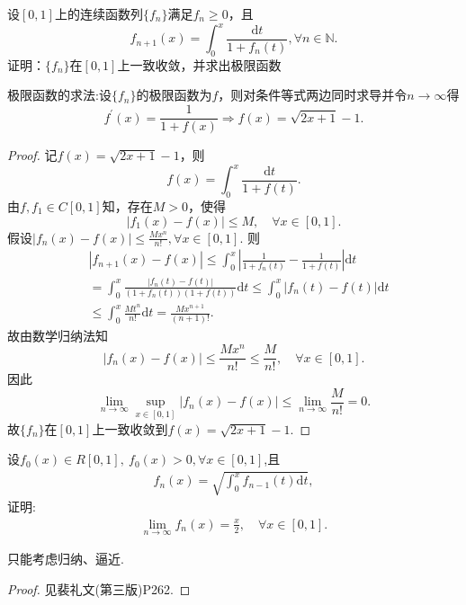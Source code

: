\documentclass[../../main.tex]{subfiles}%
\begin{document}
\begin{example}
设\( [0,1] \)上的连续函数列\( \{f_n\} \)满足\( f_n \geqslant 0 \)，且
\[
f_{n+1}(x) = \int_0^x \frac{\mathrm{d}t}{1 + f_n(t)}, \forall n \in \mathbb{N}.
\]
证明：\( \{f_n\} \)在\( [0,1] \)上一致收敛，并求出极限函数
\end{example}
\begin{note}
极限函数的求法:设\( \{f_n\} \)的极限函数为\( f \)，则对条件等式两边同时求导并令\( n\rightarrow \infty \)得
\[
f^\prime(x) = \frac{1}{1 + f(x)} \Longrightarrow f(x) = \sqrt{2x + 1} - 1.
\]
\end{note}
\begin{proof}
记\( f(x) = \sqrt{2x + 1} - 1 \)，则
\[
f(x) = \int_0^x{\frac{\mathrm{d}t}{1 + f(t)}}.
\]
由\( f,f_1 \in C[0,1] \)知，存在\( M > 0 \)，使得
\[
|f_1(x) - f(x)| \leqslant M,\quad \forall x \in [0,1].
\]
假设\( |f_n(x) - f(x)| \leqslant \frac{Mx^{n}}{n!},\forall x \in [0,1] \). 则
\begin{align*}
&|f_{n + 1}(x) - f(x)| \leqslant \int_0^x{\left| \frac{1}{1 + f_n(t)} - \frac{1}{1 + f(t)} \right|}\mathrm{d}t \\
&= \int_0^x{\frac{|f_n(t) - f(t)|}{(1 + f_n(t))(1 + f(t))}\mathrm{d}t} \leqslant \int_0^x{|f_n(t) - f(t)|\mathrm{d}t} \\
&\leqslant \int_0^x{\frac{Mt^{n}}{n!}\mathrm{d}t} = \frac{Mx^{n+1}}{(n + 1)!}.
\end{align*}
故由数学归纳法知
\[
|f_n(x) - f(x)| \leqslant \frac{Mx^{n}}{n!} \leqslant \frac{M}{n!},\quad \forall x \in [0,1].
\]
因此
\[
\lim_{n \to \infty} \sup_{x \in [0,1]} |f_n(x) - f(x)| \leqslant \lim_{n \to \infty} \frac{M}{n!} = 0.
\]
故\( \{f_n\} \)在\( [0,1] \)上一致收敛到\( f(x) = \sqrt{2x + 1} - 1 \).
\end{proof}

\begin{example}
设$f_0(x)\in R[0,1],\ f_0(x)>0,\forall x\in [0,1]$,且
\begin{align*}
f_n(x)=\sqrt{\int_0^x f_{n-1}(t)\mathrm{d}t},
\end{align*}
证明:
\begin{align*}
\lim\limits_{n\to\infty}f_n(x)=\frac{x}{2},\quad \forall x\in [0,1].
\end{align*}
\end{example}
\begin{remark}
只能考虑归纳、逼近.
\end{remark}
\begin{proof}
见裴礼文(第三版)P262.
\end{proof}
\end{document}
